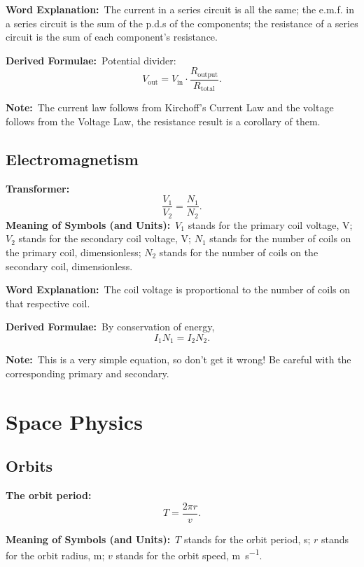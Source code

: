 \documentclass[8pt]{article}
\newcommand{\MeanSymb}{\textbf{Meaning of Symbols (and Units):}\ }
\newcommand{\WordExpl}{\textbf{Word Explanation:}\ }
\newcommand{\DeriForm}{\textbf{Derived Formulae:}\ }
\newcommand{\Note}{\textbf{Note:}\ }
\begin{document}
\begin{enumerate}
                \WordExpl The current in a series circuit is all the same; the e.m.f. in a series circuit is the sum of the p.d.s of the components; the resistance of a series circuit is the sum of each component's resistance.

                \DeriForm Potential divider:
                \[
                    V_{\text{out}} = V_{\text{in}} \cdot \frac{R_{\text{output}}}{R_{\text{total}}}.
                \]

                \Note The current law follows from Kirchoff's Current Law and the voltage follows from the Voltage Law, the resistance result is a corollary of them.
            \end{enumerate}

        \subsection{Electromagnetism}
            \textbf{Transformer:}
            \[
                \frac{V_1}{V_2} = \frac{N_1}{N_2}.
            \]
            \MeanSymb \(V_1\) stands for the primary coil voltage, \unit{\volt}; \(V_2\) stands for the secondary coil voltage, \unit{\volt}; \(N_1\) stands for the number of coils on the primary coil, dimensionless; \(N_2\) stands for the number of coils on the secondary coil, dimensionless.

            \WordExpl The coil voltage is proportional to the number of coils on that respective coil.

            \DeriForm By conservation of energy,
            \[
                I_1 N_1 = I_2 N_2.
            \]

            \Note This is a very simple equation, so don't get it wrong! Be careful with the corresponding primary and secondary.

    \section{Space Physics}
        \subsection{Orbits}
            \textbf{The orbit period:}
            \[
                T = \frac{2 \pi r}{v}.
            \]

            \MeanSymb \(T\) stands for the orbit period, \unit{\second}; \(r\) stands for the orbit radius, \unit{\metre}; \(v\) stands for the orbit speed, \unit{\metre\per\second}.
\end{document}
